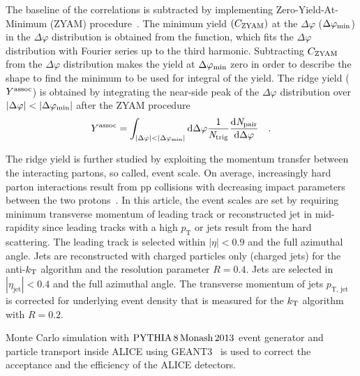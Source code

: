 The baseline of the correlations is subtracted by implementing Zero-Yield-At-Minimum (ZYAM) procedure~\cite{Ajitanand:2005jj}. The minimum yield $(C_{\rm{ZYAM}})$ at the $\Delta\varphi$ ($\Delta\varphi_{\rm{min}}$) in the $\Delta\varphi$ distribution is obtained from the function, which fits the $\Delta\varphi$ distribution with Fourier series up to the third harmonic. Subtracting $C_{\rm{ZYAM}}$ from the $\Delta\varphi$ distribution makes the yield at $\Delta\varphi_{\rm{min}}$ zero in order to describe the shape to find the minimum to be used for integral of the yield. The ridge yield ($Y^{\rm{assoc}}$) is obtained by integrating the near-side peak of the $\Delta\varphi$ distribution over $|\Delta\varphi|<|\Delta\varphi_{\rm{min}}|$ after the ZYAM procedure
\begin{eqnarray}
Y^{\rm{assoc}} = \int_{|\Delta \varphi| < |\Delta\varphi_{\rm{min}}| } \rm{d} \Delta\varphi \frac{1}{\it{N}_{\rm{trig}}} \frac{ \rm{d}\it{}N_{\rm{pair}} }{ \rm{d}\Delta\varphi } \quad.
\end{eqnarray}

The ridge yield is further studied by exploiting the momentum transfer between the interacting partons, so called, event scale. On average, increasingly hard parton interactions result from pp collisions with decreasing impact parameters between the two protons~\cite{Sjostrand:1986ep,Frankfurt:2010ea}.
In this article, the event scales are set by requiring minimum transverse momentum of leading track or reconstructed jet in mid-rapidity since leading tracks with a high $p_\mathrm{T}$ or jets result from the hard scattering. The leading track is selected within $|\eta|<0.9$ and the full azimuthal angle. Jets are reconstructed with charged particles only (charged jets) for the anti-$k_{\rm{T}}$ algorithm and the resolution parameter $R = 0.4$. Jets are selected in $|\eta_\mathrm{jet}|<0.4$ and the full azimuthal angle. The transverse momentum of jets $p_\mathrm{T,\,jet}$ is corrected for underlying event density that is measured for the $k_{\rm{T}}$ algorithm with $R = 0.2$. 

Monte Carlo simulation with $\mathrm{PYTHIA}\,8\,\mathrm{Monash}\,2013$ event generator and particle transport inside ALICE using GEANT3~\cite{Brun:1994aa} is used to correct the acceptance and the efficiency of the ALICE detectors. 


